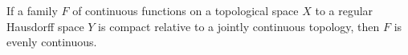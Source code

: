 If a family $F$ of continuous functions on a topological space $X$ to a regular Hausdorff space $Y$ is compact relative to a jointly continuous topology, then $F$ is evenly continuous.
